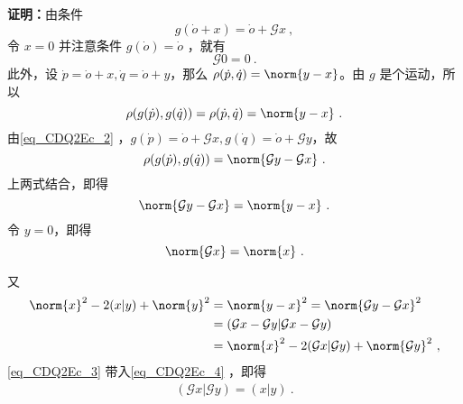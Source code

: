 \textbf{证明：}由条件
\begin{equation}\label{eq_CDQ2Ec_2}
g(\dot o+x)=\dot o+\mathcal G x~,
\end{equation}
令 $x=0$ 并注意条件 $g(\dot o)=\dot o$ ，就有
\begin{equation}
\mathcal G 0=0~.
\end{equation}
此外，设 $\dot p=\dot o+x,\dot q=\dot o+y$，那么 $\rho(\dot p,\dot q)=\norm{y-x}$。由 $g$ 是个运动，所以
\begin{equation}
\rho(g(\dot p),g(\dot q))=\rho(\dot p,\dot q)=\norm{y-x}~.
\end{equation}
由\autoref{eq_CDQ2Ec_2} ，$g(\dot p)=\dot o+\mathcal G x, g(\dot q)=\dot o+\mathcal G y$，故
\begin{equation}
\rho(g(\dot p),g(\dot q))=\norm{\mathcal Gy-\mathcal Gx}~.
\end{equation}
上两式结合，即得
\begin{equation}
\norm{\mathcal Gy-\mathcal Gx}=\norm{y-x}~.
\end{equation}
令 $y=0$，即得
\begin{equation}\label{eq_CDQ2Ec_3}
\norm{\mathcal G x}=\norm{x}~.
\end{equation}

又
\begin{equation}\label{eq_CDQ2Ec_4}
\begin{aligned}
\norm{x}^2-2(x|y)+\norm{y}^2&=\norm{y-x}^2=\norm{\mathcal G y-\mathcal G x}^2\\
&=(\mathcal G x-\mathcal G y|\mathcal G x-\mathcal G y)\\
&=\norm{x}^2-2(\mathcal G x|\mathcal G y)+\norm{\mathcal G y}^2~,
\end{aligned}
\end{equation}
\autoref{eq_CDQ2Ec_3} 带入\autoref{eq_CDQ2Ec_4} ，即得
\begin{equation}\label{eq_CDQ2Ec_5}
\begin{aligned}
(\mathcal G x|\mathcal G y)=(x|y)~.
\end{aligned}
\end{equation}

